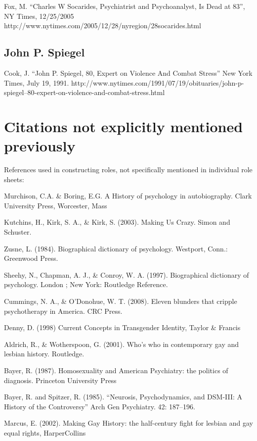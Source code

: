 Fox, M. “Charles W Socarides, Psychiatrist and Psychoanalyst, Is Dead at 83”, NY Times, 12\slash 25\slash 2005 http:\slash \slash www.nytimes.com\slash 2005\slash 12\slash 28\slash nyregion\slash 28socarides.html

\subsection{John P. Spiegel}
\label{johnp.spiegel}

Cook, J. “John P. Spiegel, 80, Expert on Violence And Combat Stress” New York Times, July 19, 1991. http:\slash \slash www.nytimes.com\slash 1991\slash 07\slash 19\slash obituaries\slash john-p-spiegel--80-expert-on-violence-and-combat-stress.html

\section{Citations not explicitly mentioned previously}
\label{citationsnotexplicitlymentionedpreviously}

References used in constructing roles, not specifically mentioned in individual role sheets:

Murchison, C.A. \& Boring, E.G. A History of psychology in autobiography. Clark University Press, Worcester, Mass

Kutchins, H., Kirk, S. A., \& Kirk, S. (2003). Making Us Crazy. Simon and Schuster.

Zusne, L. (1984). Biographical dictionary of psychology. Westport, Conn.: Greenwood Press.

Sheehy, N., Chapman, A. J., \& Conroy, W. A. (1997). Biographical dictionary of psychology. London ; New York: Routledge Reference.

Cummings, N. A., \& O'Donohue, W. T. (2008). Eleven blunders that cripple psychotherapy in America. CRC Press.

Denny, D. (1998) Current Concepts in Transgender Identity, Taylor \& Francis

Aldrich, R., \& Wotherspoon, G. (2001). Who's who in contemporary gay and lesbian history. Routledge.

Bayer, R. (1987). Homosexuality and American Psychiatry: the politics of diagnosis. Princeton University Press

Bayer, R. and Spitzer, R. (1985). “Neurosis, Psychodynamics, and DSM-III: A History of the Controversy” Arch Gen Psychiatry. 42: 187--196.

Marcus, E. (2002). Making Gay History: the half-century fight for lesbian and gay equal rights, HarperCollins

